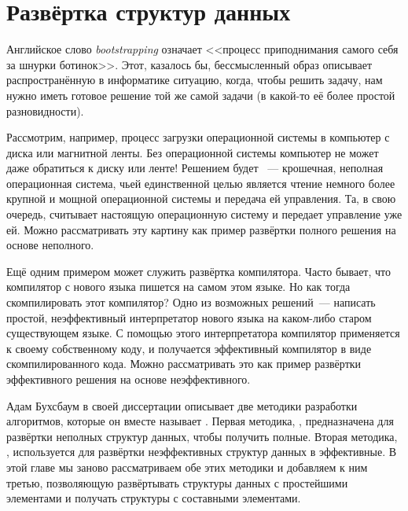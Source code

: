 \chapter{Развёртка структур данных}
\label{ch:10}

Английское слово \textit{bootstrapping}
означает <<процесс приподнимания самого себя за шнурки
ботинок>>. Этот, казалось бы, бессмысленный образ описывает
распространённую в информатике ситуацию, когда, чтобы решить задачу,
нам нужно иметь готовое решение той же самой задачи (в какой-то её
более простой разновидности).

Рассмотрим, например, процесс загрузки операционной системы в
компьютер с диска или магнитной ленты. Без операционной системы
компьютер не может даже обратиться к диску или ленте! Решением будет
~--- крошечная, неполная
операционная система, чьей единственной целью является чтение немного
более крупной и мощной операционной системы и передача ей
управления. Та, в свою очередь, считывает настоящую операционную
систему и передает управление уже ей. Можно рассматривать эту картину
как пример развёртки полного решения на основе неполного.

Ещё одним примером может служить развёртка компилятора. Часто бывает,
что компилятор с нового языка пишется на самом этом языке. Но как
тогда скомпилировать этот компилятор? Одно из возможных решений~--- написать простой,
неэффективный интерпретатор нового языка на каком-либо старом
существующем языке. С помощью этого интерпретатора компилятор применяется
к своему собственному коду, и получается эффективный компилятор в
виде скомпилированного кода. Можно рассматривать это как пример
развёртки эффективного решения на основе неэффективного.

Адам Бухсбаум в своей диссертации \cite{Buchsbaum1993} описывает две
методики разработки алгоритмов, которые он вместе называет
. Первая методика, , предназначена для развёртки
неполных структур данных, чтобы получить полные. Вторая методика,
, используется
для развёртки неэффективных структур данных в эффективные. В этой
главе мы заново рассматриваем обе этих методики и добавляем к ним
третью, позволяющую развёртывать структуры данных с простейшими
элементами и получать структуры с составными элементами.

